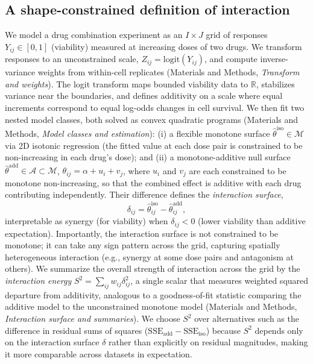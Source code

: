 \documentclass[unnumsec,webpdf,contemporary,large]{oup-authoring-template}
\begin{document}
\subsection{A shape-constrained definition of interaction}

We model a drug combination experiment as an $I\times J$ grid of responses $Y_{ij}\in[0,1]$ (viability) measured at increasing doses of two drugs.
We transform responses to an unconstrained scale, $Z_{ij}=\mathrm{logit}(Y_{ij})$, and compute inverse-variance weights from within-cell replicates (Materials and Methods, \emph{Transform and weights}).
The logit transform maps bounded viability data to $\mathbb{R}$, stabilizes variance near the boundaries, and defines additivity on a scale where equal increments correspond to equal log-odds changes in cell survival.
We then fit two nested model classes, both solved as convex quadratic programs (Materials and Methods, \emph{Model classes and estimation}):
(i) a flexible monotone surface $\hat\theta^{\mathrm{iso}}\in\mathcal{M}$ via 2D isotonic regression (the fitted value at each dose pair is constrained to be non-increasing in each drug's dose); and
(ii) a monotone-additive null surface $\hat\theta^{\mathrm{add}}\in\mathcal{A}\subset\mathcal{M}$, $\theta_{ij}=\alpha+u_i+v_j$, where $u_i$ and $v_j$ are each constrained to be monotone non-increasing, so that the combined effect is additive with each drug contributing independently.
Their difference defines the \emph{interaction surface},
\begin{equation}
\delta_{ij}=\hat\theta^{\mathrm{iso}}_{ij}-\hat\theta^{\mathrm{add}}_{ij},
\end{equation}
interpretable as synergy (for viability) when $\delta_{ij}<0$ (lower viability than additive expectation).
Importantly, the interaction surface is not constrained to be monotone; it can take any sign pattern across the grid, capturing spatially heterogeneous interaction (e.g., synergy at some dose pairs and antagonism at others).
We summarize the overall strength of interaction across the grid by the \emph{interaction energy} $S^2=\sum_{ij} w_{ij}\delta_{ij}^2$, a single scalar that measures weighted squared departure from additivity, analogous to a goodness-of-fit statistic comparing the additive model to the unconstrained monotone model (Materials and Methods, \emph{Interaction surface and summaries}).
We choose $S^2$ over alternatives such as the difference in residual sums of squares ($\mathrm{SSE}_{\mathrm{add}}-\mathrm{SSE}_{\mathrm{iso}}$) because $S^2$ depends only on the interaction surface $\delta$ rather than explicitly on residual magnitudes, making it more comparable across datasets in expectation.
\end{document}
